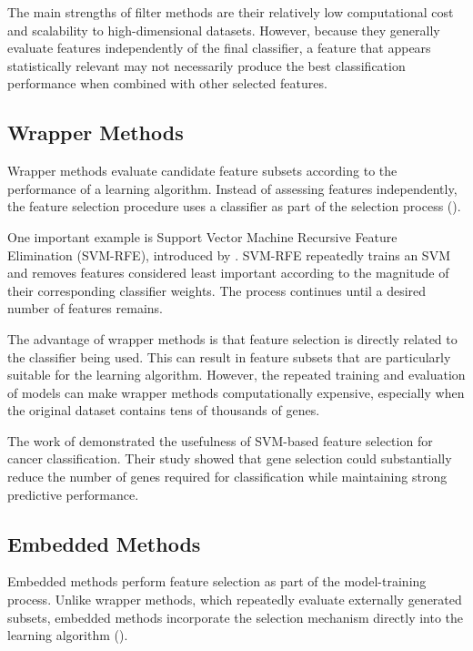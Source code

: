 The main strengths of filter methods are their relatively low computational cost and scalability to high-dimensional datasets. However, because they generally evaluate features independently of the final classifier, a feature that appears statistically relevant may not necessarily produce the best classification performance when combined with other selected features.

\subsection{Wrapper Methods}

Wrapper methods evaluate candidate feature subsets according to the performance of a learning algorithm. Instead of assessing features independently, the feature selection procedure uses a classifier as part of the selection process (\cite{tang2013feature}).

One important example is Support Vector Machine Recursive Feature Elimination (SVM-RFE), introduced by \citet{guyon_gene_2002}. SVM-RFE repeatedly trains an SVM and removes features considered least important according to the magnitude of their corresponding classifier weights. The process continues until a desired number of features remains.

The advantage of wrapper methods is that feature selection is directly related to the classifier being used. This can result in feature subsets that are particularly suitable for the learning algorithm. However, the repeated training and evaluation of models can make wrapper methods computationally expensive, especially when the original dataset contains tens of thousands of genes.

The work of \citet{guyon_gene_2002} demonstrated the usefulness of SVM-based feature selection for cancer classification. Their study showed that gene selection could substantially reduce the number of genes required for classification while maintaining strong predictive performance.

\subsection{Embedded Methods}

Embedded methods perform feature selection as part of the model-training process. Unlike wrapper methods, which repeatedly evaluate externally generated subsets, embedded methods incorporate the selection mechanism directly into the learning algorithm (\cite{venkatesh2019review}).

